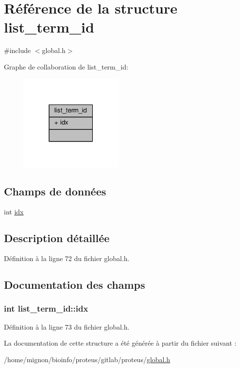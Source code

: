 \hypertarget{structlist__term__id}{\section{Référence de la structure list\+\_\+term\+\_\+id}
\label{structlist__term__id}
}


{\ttfamily \#include $<$global.\+h$>$}



Graphe de collaboration de list\+\_\+term\+\_\+id\+:\nopagebreak
\begin{figure}[H]
\begin{center}
\leavevmode
\includegraphics[width=147pt]{structlist__term__id__coll__graph}
\end{center}
\end{figure}
\subsection*{Champs de données}
\begin{DoxyCompactItemize}
\item 
int \hyperlink{structlist__term__id_a354a73556ecaf0621057432a40dd179c}{idx}
\end{DoxyCompactItemize}


\subsection{Description détaillée}


Définition à la ligne 72 du fichier global.\+h.



\subsection{Documentation des champs}
\hypertarget{structlist__term__id_a354a73556ecaf0621057432a40dd179c}{
\subsubsection[{idx}]{\setlength{\rightskip}{0pt plus 5cm}int list\+\_\+term\+\_\+id\+::idx}}\label{structlist__term__id_a354a73556ecaf0621057432a40dd179c}


Définition à la ligne 73 du fichier global.\+h.



La documentation de cette structure a été générée à partir du fichier suivant \+:\begin{DoxyCompactItemize}
\item 
/home/mignon/bioinfo/proteus/gitlab/proteus/\hyperlink{global_8h}{global.\+h}\end{DoxyCompactItemize}
